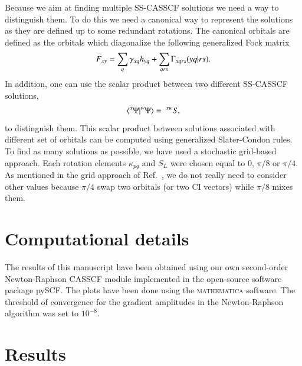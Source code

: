 \documentclass[aps,prb,reprint,showkeys,superscriptaddress]{revtex4-1}
\begin{document}
Because we aim at finding multiple SS-CASSCF solutions we need a way to distinguish them.
To do this we need a canonical way to represent the solutions as they are defined up to some redundant rotations. \cite{Helgaker_2000}
The canonical orbitals are defined as the orbitals which diagonalize the following generalized Fock matrix
\begin{equation}
  \label{eq:general_fock}
  F_{xy} = \sum_q \gamma_{xq}h_{yq} + \sum_{qrs} \Gamma_{xqrs}\ceri{yq}{rs}.
\end{equation}
In addition, one can use the scalar product between two different SS-CASSCF solutions,
\begin{equation}
  \label{eq:scalprod}
  \braket{^x\Psi}{^w\Psi} =~^{xw}S,
\end{equation}
to distinguish them.
This scalar product between solutions associated with different set of orbitals can be computed using generalized Slater-Condon rules. \cite{Burton_2021a}
To find as many solutions as possible, we have used a stochastic grid-based approach.
Each rotation elements $\kappa_{pq}$ and $S_{L}$ were chosen equal to $0$, $\pi/8$ or $\pi/4$.
As mentioned in the grid approach of Ref.~, we do not really need to consider other values because $\pi/4$ swap two orbitals (or two CI vectors) while $\pi/8$ mixes them.

\section{Computational details}
\label{sec:comp_details}

The results of this manuscript have been obtained using our own second-order Newton-Raphson CASSCF module implemented in the open-source software package pySCF. \cite{Sun_2020}
The plots have been done using the \textsc{mathematica} software. \cite{Mathematica}
The threshold of convergence for the gradient amplitudes in the Newton-Raphson algorithm was set to $10^{-8}$.

\section{Results}
\label{sec:results}

\end{document}
